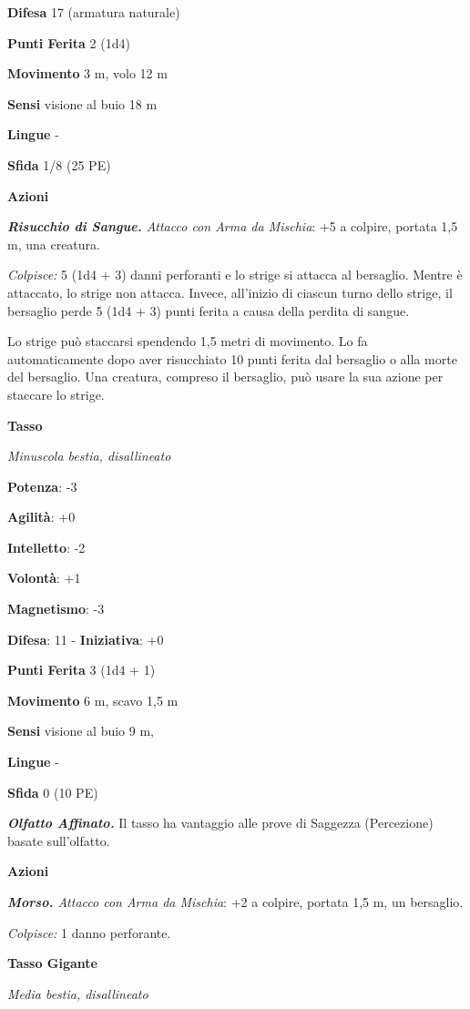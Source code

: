 \begin{multicols}{2}
\textbf{Difesa} 17 (armatura naturale)

\textbf{Punti Ferita} 2 (1d4)

\textbf{Movimento} 3 m, volo 12 m

\textbf{Sensi} visione al buio 18 m

\textbf{Lingue} -

\textbf{Sfida} 1/8 (25 PE)

\textbf{Azioni}

\emph{\textbf{Risucchio di Sangue.} Attacco con Arma da Mischia}: +5 a
colpire, portata 1,5 m, una creatura.

\emph{Colpisce:} 5 (1d4 + 3) danni perforanti e lo strige si attacca al
bersaglio. Mentre è attaccato, lo strige non attacca. Invece, all'inizio
di ciascun turno dello strige, il bersaglio perde 5 (1d4 + 3) punti
ferita a causa della perdita di sangue.

Lo strige può staccarsi spendendo 1,5 metri di movimento. Lo fa
automaticamente dopo aver risucchiato 10 punti ferita dal bersaglio o
alla morte del bersaglio. Una creatura, compreso il bersaglio, può usare
la sua azione per staccare lo strige.

\textbf{Tasso}

\emph{Minuscola bestia, disallineato}

\textbf{Potenza}: -3

\textbf{Agilità}: +0

\textbf{Intelletto}: -2

\textbf{Volontà}: +1

\textbf{Magnetismo}: -3

\textbf{Difesa}: 11 - \textbf{Iniziativa}: +0

\textbf{Punti Ferita} 3 (1d4 + 1)

\textbf{Movimento} 6 m, scavo 1,5 m

\textbf{Sensi} visione al buio 9 m, 

\textbf{Lingue} -

\textbf{Sfida} 0 (10 PE)

\emph{\textbf{Olfatto Affinato.}} Il tasso ha vantaggio alle prove di
Saggezza (Percezione) basate sull'olfatto.

\textbf{Azioni}

\emph{\textbf{Morso.} Attacco con Arma da Mischia}: +2 a colpire,
portata 1,5 m, un bersaglio.

\emph{Colpisce:} 1 danno perforante.

\textbf{Tasso Gigante}

\emph{Media bestia, disallineato}


\end{multicols}
